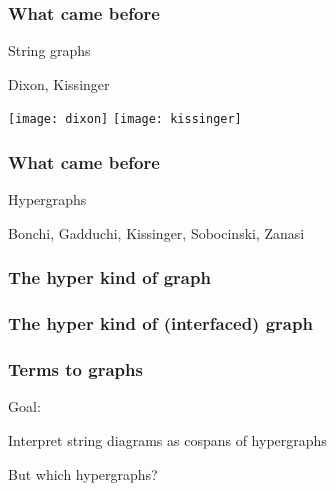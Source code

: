 \begin{frame}
    \frametitle{What came before}

    \pause
    \centering
    \LARGE
    String graphs

    \pause
    \normalsize
    \vspace{1em}
    Dixon, Kissinger

    \texttt{[image: dixon]}
    \texttt{[image: kissinger]}

\end{frame}

\begin{frame}
    \frametitle{What came before}

    \pause
    \centering
    \LARGE
    Hypergraphs
    \quad

    \pause
    \normalsize
    \vspace{1em}
    Bonchi, Gadduchi, Kissinger, Sobocinski, Zanasi

    \hypergraphpeople

\end{frame}

\begin{frame}
    \frametitle{The hyper kind of graph}

    \centering

\end{frame}

\begin{frame}
    \frametitle{The hyper kind of (interfaced) graph}

    \centering

\end{frame}

\begin{frame}
    \frametitle{Terms to graphs}

    \centering
    \LARGE

    Goal:

    Interpret \alert{string diagrams} as \alert{cospans of hypergraphs}

    \vspace{1em}
    \pause

    But which hypergraphs?

\end{frame}

